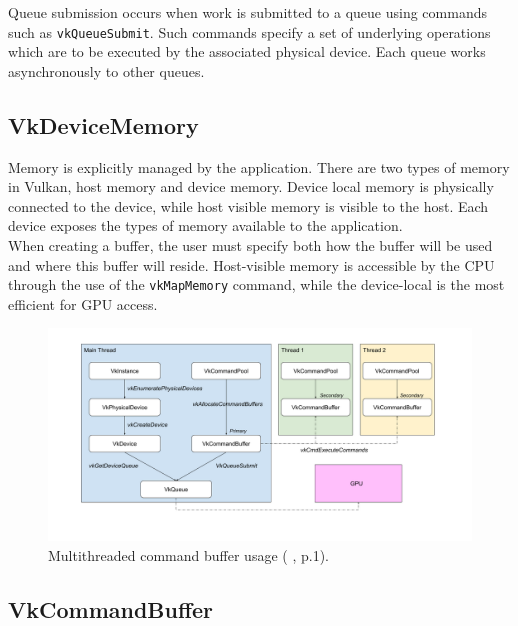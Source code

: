 \documentclass[12pt]{report}
\newcommand{\citediagram}[2]{(\citeauthor{#1} \citeyear{#1}, p.#2)}
\theoremstyle{definition}
\begin{document}
        Queue submission occurs when work is submitted to a queue using commands
        such as \texttt{vkQueueSubmit}. Such commands specify a set of underlying
        operations which are to be executed by the associated physical
        device. Each queue works asynchronously to other queues.

      \subsection{VkDeviceMemory}

        Memory is explicitly managed by the application. There are two types of
        memory in Vulkan, host memory and device memory. Device local memory is
        physically connected to the device, while host visible memory is
        visible to the host. Each device exposes the types of memory available
        to the application. \\

        When creating a buffer, the user must specify both how the buffer will
        be used and where this buffer will reside. Host-visible memory is
        accessible by the CPU through the use of the \texttt{vkMapMemory} command, while
        the device-local is the most efficient for GPU access.

      \begin{figure}[h]
        \centering
        \includegraphics[width=\textwidth]{images/pi_hierarchy.png}
        \caption{Multithreaded command buffer usage \citediagram{personalinquiry}{1}.}
        \label{fig:command_buffer}  
      \end{figure}

      \subsection{VkCommandBuffer}
\end{document}
